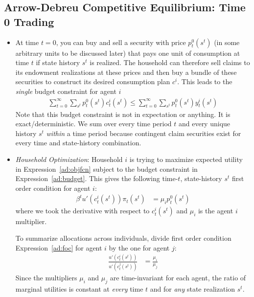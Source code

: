 \documentclass[12pt]{article}
\theoremstyle{plain}
\theoremstyle{definition}
\theoremstyle{remark}
\newcommand{\sumtinfz}{\sum^\infty_{t=0}}
\begin{document}
\clearpage
\subsection{Arrow-Debreu Competitive Equilibrium: Time 0 Trading}

\begin{itemize}
  \item
    At time $t=0$, you can buy and sell a security with price
    $p_t^0(s^t)$ (in some arbitrary units to be discussed later) that
    pays one unit of consumption at time $t$ if state history $s^t$ is
    realized.
    The household can therefore sell claims to its endowment
    realizations at these prices and then buy a bundle of these
    securities to construct its desired consumption plan $c^i$. This
    leads to the \emph{single} budget constraint for agent $i$
    \begin{align}
      \sumtinfz \sum_{s^t} p^0_t(s^t)c^i_t(s^t)
      \leq
      \sumtinfz \sum_{s^t} p^0_t(s^t)y^i_t(s^t)
      \label{ad:budget}
    \end{align}
    Note that this budget constraint is not in expectation or anything.
    It is exact/deterministic. We sum over every time period $t$ and
    every unique history $s^t$ \emph{within} a time period because
    contingent claim securities exist for every time and state-history
    combination.

  \item \emph{Household Optimization}:
    Household $i$ is trying to maximize expected utility in
    Expression~\ref{ad:objfcn} subject to the budget constraint in
    Expression~\ref{ad:budget}.  This gives the following time-$t$,
    state-history $s^t$ first order condition for agent $i$:
    \begin{align}
      \beta^t u'\left(c_t^i(s^t)\right) \pi_t(s^t)
      &= \mu_i p_t^0(s^t)
      \label{ad:foc}
    \end{align}
    where we took the derivative with respect to $c_t^i(s^t)$ and
    $\mu_i$ is the agent $i$ multiplier.

    To summarize allocations across individuals, divide first order
    condition Expression~\ref{ad:foc} for agent $i$ by the one for agent
    $j$:
    \begin{align}
      \frac{u'\left(c_t^i(s^t)\right)}{u'\left(c_t^j(s^t)\right)}
      &= \frac{\mu_i}{\mu_j}
      \label{ad:ratio}
    \end{align}
    Since the multipliers $\mu_i$ and $\mu_j$ are time-invariant for
    each agent, the ratio of marginal utilities is constant at
    \emph{every} time $t$ and for \emph{any} state realization $s^t$.


\end{itemize}
\end{document}
